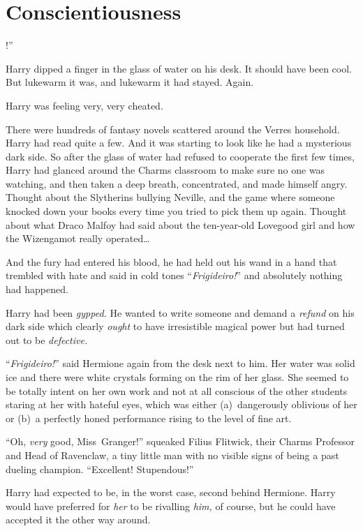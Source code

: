 \chapter{Conscientiousness}

!”

\quad\quad
Harry dipped a finger in the glass of water on his desk. It should have been
cool. But lukewarm it was, and lukewarm it had stayed. Again.

Harry was feeling very, very cheated.

There were hundreds of fantasy novels scattered around the Verres household.
Harry had read quite a few. And it was starting to look like he had a
mysterious dark side. So after the glass of water had refused to cooperate the
first few times, Harry had glanced around the Charms classroom to make sure no
one was watching, and then taken a deep breath, concentrated, and made himself
angry. Thought about the Slytherins bullying Neville, and the game where
someone knocked down your books every time you tried to pick them up again.
Thought about what Draco Malfoy had said about the ten-year-old Lovegood girl
and how the Wizengamot really operated…

And the fury had entered his blood, he had held out his wand in a hand that
trembled with hate and said in cold tones “\emph{Frigideiro!}” and absolutely
nothing had happened.

Harry had been \emph{gypped.} He wanted to write someone and demand a
\emph{refund} on his dark side which clearly \emph{ought} to have irresistible
magical power but had turned out to be \emph{defective.}

“\emph{Frigideiro!}” said Hermione again from the desk next to him. Her water
was solid ice and there were white crystals forming on the rim of her glass.
She seemed to be totally intent on her own work and not at all conscious of the
other students staring at her with hateful eyes, which was either (a)~dangerously
oblivious of her or (b)~a perfectly honed performance rising to the
level of fine art.

“Oh, \emph{very} good, Miss~Granger!” squeaked Filius Flitwick, their Charms
Professor and Head of Ravenclaw, a tiny little man with no visible signs of
being a past dueling champion. “Excellent! Stupendous!”

Harry had expected to be, in the worst case, second behind Hermione. Harry
would have preferred for \emph{her} to be rivalling \emph{him,} of course, but
he could have accepted it the other way around.

